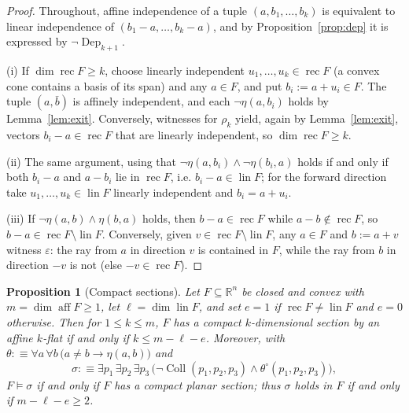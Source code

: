 \documentclass[11pt]{amsart}
\newtheorem{proposition}[theorem]{Proposition}
\theoremstyle{definition}
\newcommand{\R}{\mathbb{R}}
\newcommand{\Coll}{\operatorname{Coll}}
\newcommand{\Dep}{\operatorname{Dep}}
\newcommand{\aff}{\operatorname{aff}}
\newcommand{\rec}{\operatorname{rec}}
\newcommand{\lin}{\operatorname{lin}}
\begin{document}
\begin{proof}
Throughout, affine independence of a tuple $(a,b_1,\dots,b_k)$ is equivalent
to linear independence of $(b_1-a,\dots,b_k-a)$, and by
Proposition~\ref{prop:dep} it is expressed by $\neg\Dep_{k+1}$.

(i) If $\dim\rec F\ge k$, choose linearly independent
$u_1,\dots,u_k\in\rec F$ (a convex cone contains a basis of its span) and any
$a\in F$, and put $b_i:=a+u_i\in F$. The tuple $(a,\bar b)$ is affinely
independent, and each $\neg\eta(a,b_i)$ holds by Lemma~\ref{lem:exit}.
Conversely, witnesses for $\rho_k$ yield, again by Lemma~\ref{lem:exit},
vectors $b_i-a\in\rec F$ that are linearly independent, so
$\dim\rec F\ge k$.

(ii) The same argument, using that $\neg\eta(a,b_i)\wedge\neg\eta(b_i,a)$
holds if and only if both $b_i-a$ and $a-b_i$ lie in $\rec F$, i.e.
$b_i-a\in\lin F$; for the forward direction take
$u_1,\dots,u_k\in\lin F$ linearly independent and $b_i=a+u_i$.

(iii) If $\neg\eta(a,b)\wedge\eta(b,a)$ holds, then $b-a\in\rec F$ while
$a-b\notin\rec F$, so $b-a\in\rec F\setminus\lin F$. Conversely, given
$v\in\rec F\setminus\lin F$, any $a\in F$ and $b:=a+v$ witness
$\varepsilon$: the ray from $a$ in direction $v$ is contained in $F$, while
the ray from $b$ in direction $-v$ is not (else $-v\in\rec F$).
\end{proof}

\begin{proposition}[Compact sections]\label{prop:compactsections}
Let $F\subseteq\R^n$ be closed and convex with $m=\dim\aff F\ge1$, let
$\ell=\dim\lin F$, and set $e=1$ if $\rec F\ne\lin F$ and $e=0$ otherwise.
Then for $1\le k\le m$, $F$ has a compact $k$-dimensional section by an
affine $k$-flat if and only if $k\le m-\ell-e$. Moreover, with
$\theta:\equiv\forall a\,\forall b\,\bigl(a\ne b\to\eta(a,b)\bigr)$ and
\[
\sigma:\equiv\exists p_1\,\exists p_2\,\exists p_3\,
\bigl(\neg\Coll(p_1,p_2,p_3)\wedge\theta^{\circ}(p_1,p_2,p_3)\bigr),
\]
$F\models\sigma$ if and only if $F$ has a compact planar section; thus
$\sigma$ holds in $F$ if and only if $m-\ell-e\ge2$.
\end{proposition}
\end{document}
